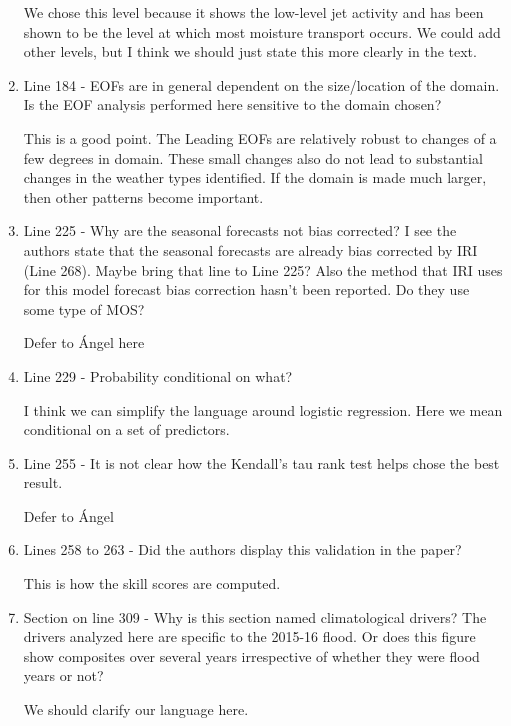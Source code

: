 \documentclass{article}
\newenvironment{answer}{\begin{mdframed}}{\end{mdframed}}
\begin{document}
\begin{enumerate}
\begin{answer}
		We chose this level because it shows the low-level jet activity and has been shown to be the level at which most moisture transport occurs.
		We could add other levels, but I think we should just state this more clearly in the text.
	\end{answer}
	\item Line 184 - EOFs are in general dependent on the size/location of the domain. Is the EOF analysis performed here sensitive to the domain chosen?
	\begin{answer}
		This is a good point.
		The Leading EOFs are relatively robust to changes of a few degrees in domain.
		These small changes also do not lead to substantial changes in the weather types identified.
		If the domain is made much larger, then other patterns become important.
	\end{answer}
	\item Line 225 - Why are the seasonal forecasts not bias corrected? I see the authors state that the seasonal forecasts are already bias corrected by IRI (Line 268). Maybe bring that line to Line 225? Also the method that IRI uses for this model forecast bias correction hasn't been reported. Do they use some type of MOS?
	\begin{answer}
		Defer to \'{A}ngel here
	\end{answer}
	\item Line 229 - Probability conditional on what?
	\begin{answer}
		I think we can simplify the language around logistic regression.
		Here we mean conditional on a set of predictors.
	\end{answer}
	\item Line 255 - It is not clear how the Kendall's tau rank test helps chose the best result.
	\begin{answer}
		Defer to \'{A}ngel
	\end{answer}
	\item Lines 258 to 263 - Did the authors display this validation in the paper?
	\begin{answer}
		This is how the skill scores are computed.
	\end{answer}
	\item Section on line 309 - Why is this section named climatological drivers? The drivers analyzed here are specific to the 2015-16 flood. Or does this figure show composites over several years irrespective of whether they were flood years or not?
	\begin{answer}
		We should clarify our language here.

\end{answer}
\end{enumerate}
\end{document}
